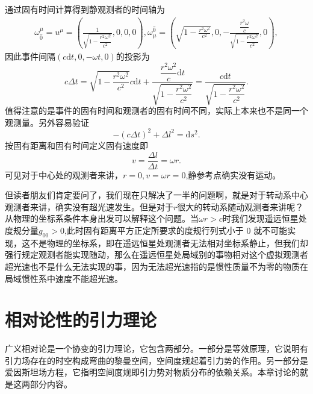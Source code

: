 \documentclass[11pt, a4paper, oneside, onecolumn]{ctexart}
\numberwithin{equation}{subsection}
\begin{document}
通过固有时间计算得到静观测者的时间轴为
\begin{align}
\omega_{\hat{0}}^{\mu}=u^{\mu}=\left(\frac{1}{\sqrt{1-\dfrac{r^{2}\omega^{2}}{c^{2}}}},0,0,0\right),\omega_{\mu}^{\hat{0}}=\left(\sqrt{1-\frac{r^{2}\omega^{2}}{c^{2}}},0,-\frac{\dfrac{r^{2}\omega}{c}}{\sqrt{1-\dfrac{r^{2}\omega^{2}}{c^{2}}}},0\right),
\end{align}
因此事件间隔$\left(c\mathrm{d}t,0,-\omega t,0\right)$的投影为
\begin{equation}
c\Delta{}t=\sqrt{1-\frac{r^{2}\omega^{2}}{c^{2}}}c\mathrm{d}t+\frac{\dfrac{r^{2}\omega^{2}}{c}\mathrm{d}t}{\sqrt{1-\dfrac{r^{2}\omega^{2}}{c^{2}}}}=\frac{c\mathrm{d}t}{\sqrt{1-\dfrac{r^{2}\omega^{2}}{c^{2}}}}.
\end{equation}
值得注意的是事件的固有时间和观测者的固有时间不同，实际上本来也不是同一个观测量。另外容易验证
\begin{equation}
-\left(c\Delta{}t\right)^{2}+\Delta{}l^{2}=\mathrm{d}s^{2}.
\end{equation}
按固有距离和固有时间定义固有速度即
\begin{equation}
v=\frac{\Delta{}l}{\Delta{}t}=\omega r.
\end{equation}
可见对于中心处的观测者来讲，$r=0,v=\omega r=0$,静参考点确实没有运动。

但读者朋友们肯定要问了，我们现在只解决了一半的问题啊，就是对于转动系中心观测者来讲，确实没有超光速发生。但是对于$r$很大的转动系随动观测者来讲呢？从物理的坐标系条件本身出发可以解释这个问题。当$\omega r>c$时我们发现遥远恒星处度规分量$g_{00}>0$,此时固有距离平方正定所要求的度规行列式小于 0 就不可能实现，这不是物理的坐标系，即在遥远恒星处观测者无法相对坐标系静止，但我们却强行规定观测者能实现随动，那么在遥远恒星处局域别的事物相对这个虚拟观测者超光速也不是什么无法实现的事，因为无法超光速指的是惯性质量不为零的物质在局域惯性系中速度不能超光速。

\newpage
\section{相对论性的引力理论}
广义相对论是⼀个协变的引⼒理论，它包含两部分。⼀部分是等效原理，它说明有引⼒场存在的时空构成弯曲的黎曼空间，空间度规起着引⼒势的作⽤。另⼀部分是爱因斯坦场⽅程，它指明空间度规即引⼒势对物质分布的依赖关系。本章讨论的就是这两部分内容。
\end{document}
